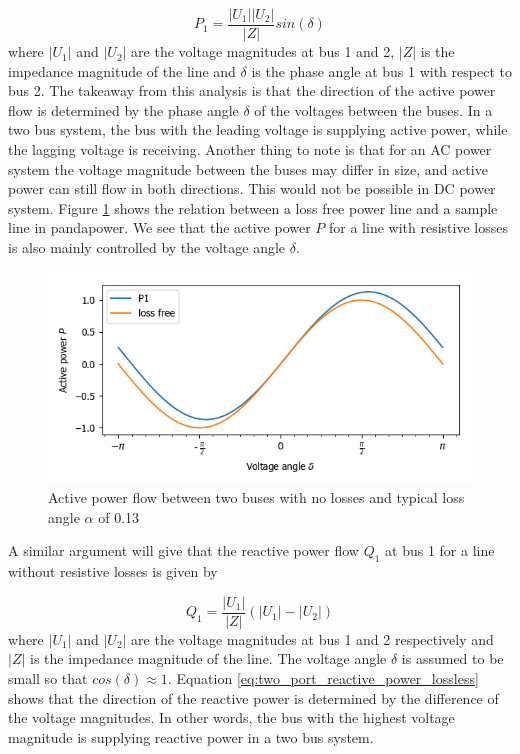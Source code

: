 \documentclass{report}
\begin{document}
\begin{equation}\label{eq:two_port_active_power_lossless}
P_{1} =  \frac{|U_{1}||U_{2}|}{|Z|}sin(\delta)
\end{equation}
where $|U_{1}|$ and $|U_{2}|$ are the voltage magnitudes at bus 1 and 2, $|Z|$ is the impedance magnitude of the line and $\delta$ is the phase angle at bus 1 with respect to bus 2. The takeaway from this analysis is that the direction of the active power flow is determined by the phase angle $\delta$ of the voltages between the buses. In a two bus system, the bus with the leading voltage is supplying active power, while the lagging voltage is receiving. Another thing to note is that for an AC power system the voltage magnitude between the buses may differ in size, and active power can still flow in both directions. This would not be possible in DC power system. Figure \ref{fig:theory:active_power_flow} shows the relation between a loss free power line and a sample line in pandapower. We see that the active power $P$ for a line with resistive losses is also mainly controlled by the voltage angle $\delta$.

\begin{figure}[ht!]
    \center
    \includegraphics[width=12cm]{figures/active_power_flow.png}
    \caption[size = 9]{Active power flow between two buses with no losses and typical loss angle $\alpha$ of 0.13}
	\label{fig:theory:active_power_flow}
\end{figure}

A similar argument will give that the reactive power flow $Q_{1}$ at bus 1 for a line without resistive losses is given by 

\begin{equation}\label{eq:two_port_reactive_power_lossless}
Q_{1} =  \frac{|U_{1}|}{|Z|}(|U_{1}| - |U_{2}|)
\end{equation}
where $|U_{1}|$ and $|U_{2}|$ are the voltage magnitudes at bus 1 and 2 respectively and $|Z|$ is the impedance magnitude of the line. The voltage angle $\delta$ is assumed to be small so that $cos(\delta) \approx 1$. Equation \eqref{eq:two_port_reactive_power_lossless} shows that the direction of the reactive power is determined by the difference of the voltage magnitudes. In other words, the bus with the highest voltage magnitude is supplying reactive power in a two bus system.
\end{document}
